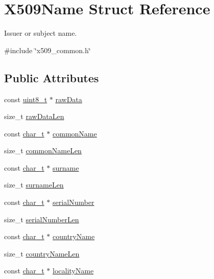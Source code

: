 \hypertarget{structX509Name}{}\section{X509\+Name Struct Reference}
\label{structX509Name}


Issuer or subject name.  




{\ttfamily \#include \char`\"{}x509\+\_\+common.\+h\char`\"{}}

\subsection*{Public Attributes}
\begin{DoxyCompactItemize}
\item 
const \hyperlink{stdint_8h_aba7bc1797add20fe3efdf37ced1182c5}{uint8\+\_\+t} $\ast$ \hyperlink{structX509Name_a16f889e11f79b38a1ade245692857253}{raw\+Data}
\item 
size\+\_\+t \hyperlink{structX509Name_a0f57dd73feee5e3a4aa769fa1ecf3766}{raw\+Data\+Len}
\item 
const \hyperlink{compiler__port_8h_a40bb5262bf908c328fbcfbe5d29d0201}{char\+\_\+t} $\ast$ \hyperlink{structX509Name_a29948ef6424aa86551582e5bf7afa47a}{common\+Name}
\item 
size\+\_\+t \hyperlink{structX509Name_a5c5af434bfa902d83cae8cec8af15581}{common\+Name\+Len}
\item 
const \hyperlink{compiler__port_8h_a40bb5262bf908c328fbcfbe5d29d0201}{char\+\_\+t} $\ast$ \hyperlink{structX509Name_aa9a667195b0076689e31a6995d925cc0}{surname}
\item 
size\+\_\+t \hyperlink{structX509Name_a43f4016488337cbd57078b9b51720645}{surname\+Len}
\item 
const \hyperlink{compiler__port_8h_a40bb5262bf908c328fbcfbe5d29d0201}{char\+\_\+t} $\ast$ \hyperlink{structX509Name_ab59d7753a4b9c386e9d10c5ddc609ec5}{serial\+Number}
\item 
size\+\_\+t \hyperlink{structX509Name_ad24a46ee271b93997a308179a6e8f154}{serial\+Number\+Len}
\item 
const \hyperlink{compiler__port_8h_a40bb5262bf908c328fbcfbe5d29d0201}{char\+\_\+t} $\ast$ \hyperlink{structX509Name_aebedcf83915608e1929d6cc612a67c2e}{country\+Name}
\item 
size\+\_\+t \hyperlink{structX509Name_ae146dda0b021633e3cfc15bda3435bf9}{country\+Name\+Len}
\item 
const \hyperlink{compiler__port_8h_a40bb5262bf908c328fbcfbe5d29d0201}{char\+\_\+t} $\ast$ \hyperlink{structX509Name_a9e5c517817abea85a4ad7a8fa074fb76}{locality\+Name}

\end{DoxyCompactItemize}
